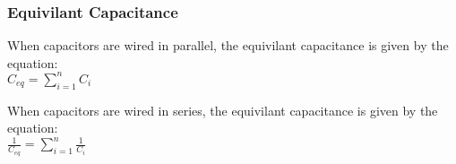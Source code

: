 \subsubsection*{Equivilant Capacitance}
\hspace{.5cm} When capacitors are wired in parallel, the equivilant capacitance is given by the equation:\\
\vbox{
    \center
    $C_{eq} = \sum_{i=1}^{n} C_i$
}
\vspace{12pt}

\hspace{.5cm} When capacitors are wired in series, the equivilant capacitance is given by the equation:\\
\vbox{
    \center
    $\frac{1}{C_{eq}} = \sum_{i=1}^{n} \frac{1}{C_i}$
}

